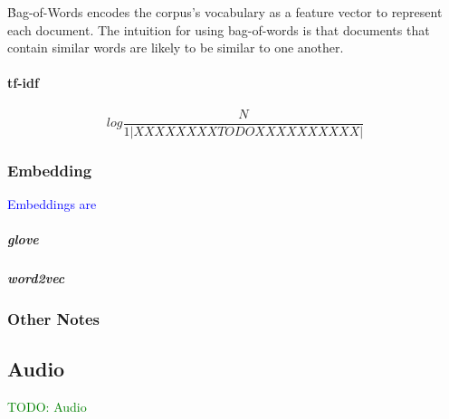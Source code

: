 \r{Bag-of-Words encodes the corpus's vocabulary as a feature vector to represent each document. The intuition for using bag-of-words is that documents that contain similar words are likely to be similar to one another.}


\paragraph{tf-idf}


\begin{equation}
{log\frac{N}{1|XXXXXXXXTODOXXXXXXXXXX|}}
\label{eq:tf_idf_def}
\end{equation}

\subsubsection{Embedding}





\textcolor{blue}{Embeddings are }

\subparagraph{glove}


\subparagraph{word2vec}


\subsubsection{Other Notes}


\subsection{Audio}


\textcolor{green}{TODO: Audio}
